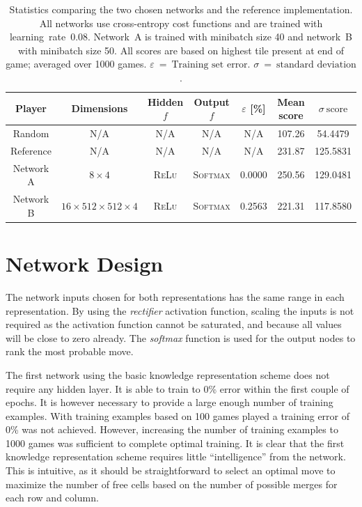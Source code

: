 \begin{table}
\centering
{\small
\begin{tabular}{ccccccc}
\toprule
Player    & Dimensions                          & Hidden $f$    & Output $f$       & $\varepsilon$ [\%] & Mean score & $\sigma~\text{score}$ \\
\midrule
Random    & N/A                                 & N/A           & N/A              & N/A                & 107.26     &  54.4479              \\
Reference & N/A                                 & N/A           & N/A              & N/A                & 231.87     & 125.5831              \\
Network A & $8 \times 4$                        & \textsc{ReLu} & \textsc{Softmax} & 0.0000             & 250.56     & 129.0481              \\
Network B & $16 \times 512 \times 512 \times 4$ & \textsc{ReLu} & \textsc{Softmax} & 0.2563             & 221.31     & 117.8580              \\
\bottomrule
\end{tabular}
}
\caption{Statistics comparing the two chosen networks and the reference implementation. All networks use cross-entropy cost functions and are trained with learning~rate~0.08. Network~A is trained with minibatch size 40 and network~B with minibatch size 50. All scores are based on highest tile present at end of game; averaged over 1000 games. $\varepsilon~=~\text{Training set error}$. $\sigma~=~\text{standard deviation}$.}
\label{table:results}
\end{table}

\section*{Network Design}

The network inputs chosen for both representations has the same range in each representation. By using the \textit{rectifier} activation function, scaling the inputs is not required as the activation function cannot be saturated, and because all values will be close to zero already. The \textit{softmax} function is used for the output nodes to rank the most probable move.

The first network using the basic knowledge representation scheme does not require any hidden layer. It is able to train to 0\% error within the first couple of epochs. It is however necessary to provide a large enough number of training examples. With training examples based on 100 games played a training error of 0\% was not achieved. However, increasing the number of training examples to 1000 games was sufficient to complete optimal training. It is clear that the first knowledge representation scheme requires little ``intelligence'' from the network. This is intuitive, as it should be straightforward to select an optimal move to maximize the number of free cells based on the number of possible merges for each row and column.

